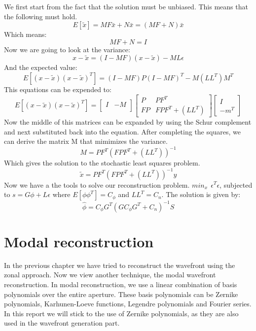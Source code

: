 \documentclass{article}
\begin{document}
We first start from the fact that the solution must be unbiased. This means that the following must hold.
$$ E[\tilde{x}]=MF\bar{x} + N\bar{x}=(MF+N)\bar{x}$$
Which means:
$$MF+N=I$$  
Now we are going to look at the variance:
$$x-\tilde{x}=(I-MF)(x-\tilde{x})-ML\epsilon$$
And the expected value:
$$ E[(x-\tilde{x})(x-\tilde{x})^T] = (I-MF)P(I-MF)^T - M(LL^T)M^T$$
This equations can be expended to:
$$ E[(x-\tilde{x})(x-\tilde{x})^T] =
\begin{bmatrix}
I & -M \\
\end{bmatrix}
\begin{bmatrix}
P  & PF^T \\
FP & FPF^T+(LL^T)
\end{bmatrix}
\begin{bmatrix}
I  \\
-m^T
\end{bmatrix}
$$ 
Now the middle of this matrices can be expanded by using the Schur complement and next substituted back into the equation. After completing the squares, we can derive the matrix M that mimimizes the variance.
$$ M = PF^T(FPF^T+(LL^T))^{-1}$$
Which gives the solution to the stochastic least squares problem.
$$\tilde{x} = PF^T(FPF^T+(LL^T))^{-1}y$$
Now we have a the tools to solve our reconstruction problem.
\newline
\newline
$ min_x \ \ \epsilon^T \epsilon $, subjected to $ s=G\phi + L\epsilon$
\newline
\newline
where $E[\phi\phi^T]=C_\phi$ and $LL^T=C_n$. The solution is given by:
$$\hat{\phi} = C_\phi G^T(GC_\phi G^T + C_n)^{-1}S $$

\newpage
\section{Modal reconstruction}
In the previous chapter we have tried to reconstruct the wavefront using the zonal approach. Now we view another technique, the modal wavefront reconstruction. In modal reconstruction, we use a linear combination of basis polynomials over the entire aperture. These basis polynomials can be Zernike polynomials, Karhunen-Loeve functions, Legendre polynomials and Fourier series. In this report we will stick to the use of Zernike polynomials, as they are also used in the wavefront generation part. 
\end{document}
